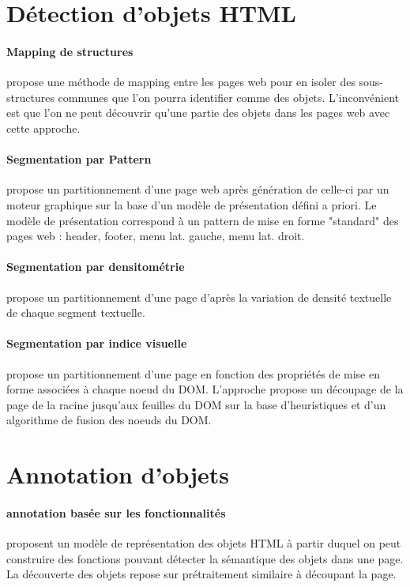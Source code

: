 \documentclass[french]{book}
\begin{document}
\section{Détection d'objets HTML}
\paragraph*{Mapping de structures} \citep{chang2001iepad} propose une méthode de mapping entre les pages web pour en isoler des sous-structures communes que l'on pourra identifier comme des objets. L'inconvénient est que l'on ne peut découvrir qu'une partie des objets dans les pages web avec cette approche. 

\paragraph*{Segmentation par Pattern} \citep{kovacevic2002recognition} propose un partitionnement d'une page web après génération de celle-ci par un moteur graphique sur la base d'un modèle de présentation défini a priori. Le modèle de présentation correspond à un pattern de mise en forme "standard" des pages web : header, footer, menu lat. gauche, menu lat. droit. 

\paragraph*{Segmentation par densitométrie} \citep{lin2002discovering} propose un partitionnement d'une page d'après la variation de densité textuelle de chaque segment textuelle.

\paragraph*{Segmentation par indice visuelle} \citep{kohlschutter2008densitometric} propose un partitionnement d'une page en fonction des propriétés de mise en forme associées à chaque noeud du DOM. L'approche propose un découpage de la page de la racine jusqu'aux feuilles du DOM sur la base d'heuristiques et d'un algorithme de fusion des noeuds du DOM.

\section{Annotation d'objets} 

\paragraph*{annotation basée sur les fonctionnalités} \citep{chen2001function} proposent un modèle de représentation des objets HTML à partir duquel on peut construire des fonctions pouvant détecter la sémantique des objets dans une page. La découverte des objets repose sur prétraitement similaire à \citep{kohlschutter2008densitometric} découpant la page.
\end{document}
